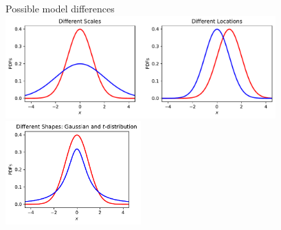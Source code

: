 \begin{frame}{Possible model differences}%
\centering
	\includegraphics[width=0.78\textwidth]{../../figs/2GaussianPDFs2Scales2Locations.pdf}
	\includegraphics[width=0.39\textwidth]{../../figs/diff_shapes_Gauss_t.pdf}
\end{frame}

